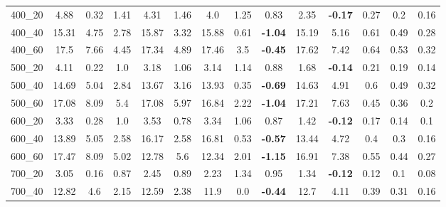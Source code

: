 \begin{tabular}{c|ccccccccccccc}
400\_20      & 4.88         & 0.32         & 1.41         & 4.31         & 1.46         & 4.0          & 1.25         & 0.83         & 2.35         & {\bf -0.17}  & 0.27         & 0.2          & 0.16         \\ 
400\_40      & 15.31        & 4.75         & 2.78         & 15.87        & 3.32         & 15.88        & 0.61         & {\bf -1.04}  & 15.19        & 5.16         & 0.61         & 0.49         & 0.28         \\ 
400\_60      & 17.5         & 7.66         & 4.45         & 17.34        & 4.89         & 17.46        & 3.5          & {\bf -0.45}  & 17.62        & 7.42         & 0.64         & 0.53         & 0.32         \\ 
500\_20      & 4.11         & 0.22         & 1.0          & 3.18         & 1.06         & 3.14         & 1.14         & 0.88         & 1.68         & {\bf -0.14}  & 0.21         & 0.19         & 0.14         \\ 
500\_40      & 14.69        & 5.04         & 2.84         & 13.67        & 3.16         & 13.93        & 0.35         & {\bf -0.69}  & 14.63        & 4.91         & 0.6          & 0.49         & 0.32         \\ 
500\_60      & 17.08        & 8.09         & 5.4          & 17.08        & 5.97         & 16.84        & 2.22         & {\bf -1.04}  & 17.21        & 7.63         & 0.45         & 0.36         & 0.2          \\ 
600\_20      & 3.33         & 0.28         & 1.0          & 3.53         & 0.78         & 3.34         & 1.06         & 0.87         & 1.42         & {\bf -0.12}  & 0.17         & 0.14         & 0.1          \\ 
600\_40      & 13.89        & 5.05         & 2.58         & 16.17        & 2.58         & 16.81        & 0.53         & {\bf -0.57}  & 13.44        & 4.72         & 0.4          & 0.3          & 0.16         \\ 
600\_60      & 17.47        & 8.09         & 5.02         & 12.78        & 5.6          & 12.34        & 2.01         & {\bf -1.15}  & 16.91        & 7.38         & 0.55         & 0.44         & 0.27         \\ 
700\_20      & 3.05         & 0.16         & 0.87         & 2.45         & 0.89         & 2.23         & 1.34         & 0.95         & 1.34         & {\bf -0.12}  & 0.12         & 0.1          & 0.08         \\ 
700\_40      & 12.82        & 4.6          & 2.15         & 12.59        & 2.38         & 11.9         & 0.0          & {\bf -0.44}  & 12.7         & 4.11         & 0.39         & 0.31         & 0.16         \\ 

\end{tabular}
